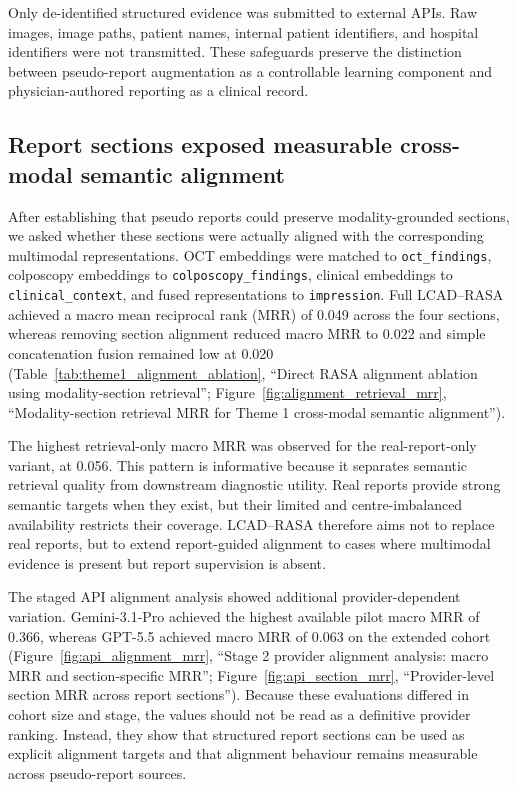 Only de-identified structured evidence was submitted to external APIs. Raw images, image paths, patient names, internal patient identifiers, and hospital identifiers were not transmitted. These safeguards preserve the distinction between pseudo-report augmentation as a controllable learning component and physician-authored reporting as a clinical record.

\subsection{Report sections exposed measurable cross-modal semantic alignment}
\label{subsec:alignment_results}

After establishing that pseudo reports could preserve modality-grounded sections, we asked whether these sections were actually aligned with the corresponding multimodal representations. OCT embeddings were matched to \texttt{oct\_findings}, colposcopy embeddings to \texttt{colposcopy\_findings}, clinical embeddings to \texttt{clinical\_context}, and fused representations to \texttt{impression}. Full LCAD--RASA achieved a macro mean reciprocal rank (MRR) of 0.049 across the four sections, whereas removing section alignment reduced macro MRR to 0.022 and simple concatenation fusion remained low at 0.020 (Table~\ref{tab:theme1_alignment_ablation}, ``Direct RASA alignment ablation using modality-section retrieval''; Figure~\ref{fig:alignment_retrieval_mrr}, ``Modality-section retrieval MRR for Theme 1 cross-modal semantic alignment'').

The highest retrieval-only macro MRR was observed for the real-report-only variant, at 0.056. This pattern is informative because it separates semantic retrieval quality from downstream diagnostic utility. Real reports provide strong semantic targets when they exist, but their limited and centre-imbalanced availability restricts their coverage. LCAD--RASA therefore aims not to replace real reports, but to extend report-guided alignment to cases where multimodal evidence is present but report supervision is absent.

The staged API alignment analysis showed additional provider-dependent variation. Gemini-3.1-Pro achieved the highest available pilot macro MRR of 0.366, whereas GPT-5.5 achieved macro MRR of 0.063 on the extended cohort (Figure~\ref{fig:api_alignment_mrr}, ``Stage 2 provider alignment analysis: macro MRR and section-specific MRR''; Figure~\ref{fig:api_section_mrr}, ``Provider-level section MRR across report sections''). Because these evaluations differed in cohort size and stage, the values should not be read as a definitive provider ranking. Instead, they show that structured report sections can be used as explicit alignment targets and that alignment behaviour remains measurable across pseudo-report sources.

